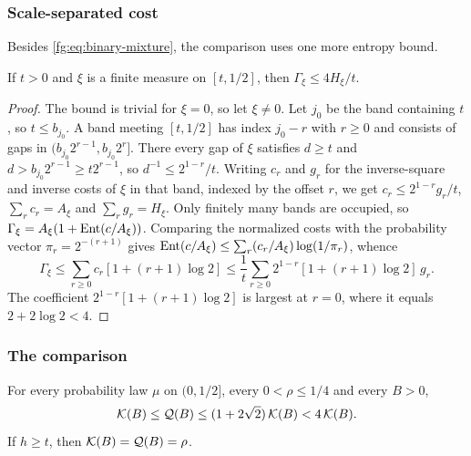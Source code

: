 \subsubsection{Scale-separated cost}
Besides \eqref{fg:eq:binary-mixture}, the comparison uses one more entropy
bound.

\begin{lemma}\label{fg:lem:scale-separated}
If $t>0$ and $\xi$ is a finite measure on $[t,1/2]$, then
$\Gamma_\xi\le4H_\xi/t$.
\end{lemma}

\begin{proof}
The bound is trivial for $\xi=0$, so let $\xi\ne0$. Let $j_0$ be the
band containing $t$, so $t\le b_{j_0}$. A band
meeting $[t,1/2]$ has index $j_0-r$ with $r\ge0$ and consists of gaps
in $(b_{j_0}2^{r-1},b_{j_0}2^r]$. There every gap of $\xi$ satisfies
$d\ge t$ and $d>b_{j_0}2^{r-1}\ge t2^{r-1}$, so $d^{-1}\le2^{1-r}/t$.
Writing $c_r$ and $g_r$ for the inverse-square and inverse costs of
$\xi$ in that band, indexed by the offset $r$, we get
$c_r\le2^{1-r}g_r/t$, $\sum_rc_r=A_\xi$ and $\sum_rg_r=H_\xi$. Only
finitely many bands are occupied, so
$\Gamma_\xi=A_\xi(1+\operatorname{Ent}(c/A_\xi))$. Comparing the normalized costs
with the probability vector $\pi_r=2^{-(r+1)}$ gives
$\operatorname{Ent}(c/A_\xi)\le\sum_r(c_r/A_\xi)\log(1/\pi_r)$, whence
\[
 \Gamma_\xi\le\sum_{r\ge0}c_r[1+(r+1)\log2]
 \le\frac1t\sum_{r\ge0}2^{1-r}[1+(r+1)\log2]\,g_r.
\]
The coefficient $2^{1-r}[1+(r+1)\log2]$ is largest at $r=0$, where it
equals $2+2\log2<4$.
\end{proof}

\subsubsection{The comparison}
\begin{proposition}\label{fg:prop:quantile-selection}
For every probability law $\mu$ on $(0,1/2]$, every $0<\rho\le1/4$ and
every $B>0$,
\[
 \mathcal K(B)\le\mathcal Q(B)\le(1+2\sqrt2)\,\mathcal K(B)<4\,\mathcal K(B).
\]
If $h\ge t$, then $\mathcal K(B)=\mathcal Q(B)=\rho$.
\end{proposition}

